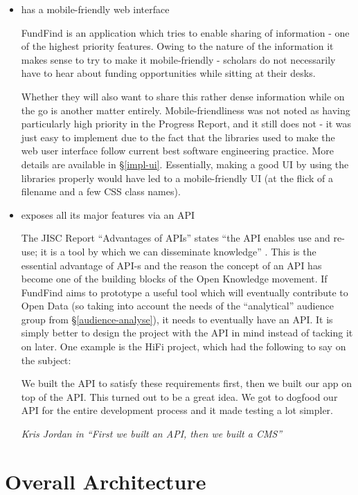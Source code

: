 \begin{itemize}
 \item has a mobile-friendly web interface
 
 FundFind is an application which tries to enable sharing of information - one of the highest priority features. Owing to the nature of the information it makes sense to try to make it mobile-friendly - scholars do not necessarily have to hear about funding opportunities while sitting at their desks.
 
 Whether they will also want to share this rather dense information while on the go is another matter entirely. Mobile-friendliness was not noted as having particularly high priority in the Progress Report, and it still does not - it was just easy to implement due to the fact that the libraries used to make the web user interface follow current best software engineering practice. More details are available in \S\ref{impl-ui}. Essentially, making a good UI by using the libraries properly would have led to a mobile-friendly UI (at the flick of a filename and a few CSS class names).
 
 \item exposes all its major features via an API
 
 The JISC Report ``Advantages of APIs'' states ``the API enables use and re-use; it is a tool by which we can disseminate knowledge'' \cite{advantages-apis}. This is the essential advantage of API-s and the reason the concept of an API has become one of the building blocks of the Open Knowledge movement. If FundFind aims to prototype a useful tool which will eventually contribute to Open Data (so taking into account the needs of the ``analytical'' audience group from \S\ref{audience-analyse}), it needs to eventually have an API. It is simply better to design the project with the API in mind instead of tacking it on later. One example is the HiFi project, which had the following to say on the subject:
 
 \begin{shadequote}
  We built the API to satisfy these requirements first, then we built our app on top of the API. This turned out to be a great idea. We got to dogfood our API for the entire development process and it made testing a lot simpler.
  \par\emph{Kris Jordan in ``First we built an API, then we built a CMS'' \cite{hifi-api}}
 \end{shadequote}
 
\end{itemize}

\section{Overall Architecture}

